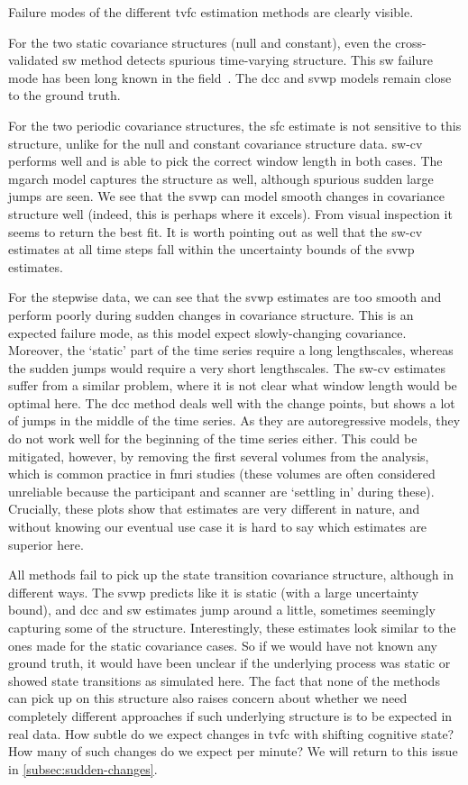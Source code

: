Failure modes of the different \gls{tvfc} estimation methods are clearly visible.

For the two static covariance structures (null and constant), even the cross-validated \gls{sw} method detects spurious time-varying structure.
This \gls{sw} failure mode has been long known in the field~\parencite{Lindquist2014, Hindriks2016}.
The \gls{dcc} and \gls{svwp} models remain close to the ground truth.

For the two periodic covariance structures, the \gls{sfc} estimate is not sensitive to this structure, unlike for the null and constant covariance structure data.
\gls{sw-cv} performs well and is able to pick the correct window length in both cases.
The \gls{mgarch} model captures the structure as well, although spurious sudden large jumps are seen.
We see that the \gls{svwp} can model smooth changes in covariance structure well (indeed, this is perhaps where it excels).
From visual inspection it seems to return the best fit.
It is worth pointing out as well that the \gls{sw-cv} estimates at all time steps fall within the uncertainty bounds of the \gls{svwp} estimates.

For the stepwise data, we can see that the \gls{svwp} estimates are too smooth and perform poorly during sudden changes in covariance structure.
This is an expected failure mode, as this model expect slowly-changing covariance.
Moreover, the `static' part of the time series require a long lengthscales, whereas the sudden jumps would require a very short lengthscales.
The \gls{sw-cv} estimates suffer from a similar problem, where it is not clear what window length would be optimal here.
The \gls{dcc} method deals well with the change points, but shows a lot of jumps in the middle of the time series.
As they are autoregressive models, they do not work well for the beginning of the time series either.
This could be mitigated, however, by removing the first several volumes from the analysis, which is common practice in \gls{fmri} studies (these volumes are often considered unreliable because the participant and scanner are `settling in' during these).
Crucially, these plots show that estimates are very different in nature, and without knowing our eventual use case it is hard to say which estimates are superior here.

All methods fail to pick up the state transition covariance structure, although in different ways.
The \gls{svwp} predicts like it is static (with a large uncertainty bound), and \gls{dcc} and \gls{sw} estimates jump around a little, sometimes seemingly capturing some of the structure.
Interestingly, these estimates look similar to the ones made for the static covariance cases.
So if we would have not known any ground truth, it would have been unclear if the underlying process was static or showed state transitions as simulated here.
The fact that none of the methods can pick up on this structure also raises concern about whether we need completely different approaches if such underlying structure is to be expected in real data.
How subtle do we expect changes in \gls{tvfc} with shifting cognitive state?
How many of such changes do we expect per minute?
We will return to this issue in \cref{subsec:sudden-changes}.

